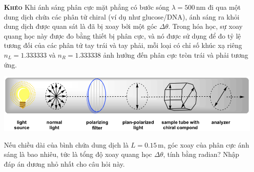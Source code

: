 \begin{problem}
{\textbf{\textsc{Khéo}}}
Khi ánh sáng phân cực mặt phẳng có bước sóng \( \lambda = 500 \, \text{nm} \) đi qua một dung dịch chứa các phân tử chiral (ví dụ như glucose/DNA), ánh sáng ra khỏi dung dịch được quan sát là đã bị xoay bởi một góc \( \Delta \theta \). Trong hóa học, sự xoay quang học này được đo bằng thiết bị phân cực, và nó được sử dụng để đo tỷ lệ tương đối của các phân tử tay trái và tay phải, mỗi loại có chỉ số khúc xạ riêng \( n_L = 1.333333 \) và \( n_R = 1.333338 \) ảnh hưởng đến phân cực tròn trái và phải tương ứng.

\begin{center}
\includegraphics[width=.8\textwidth]{problems/figures/opticalRotationSchematic.png}
\end{center}

Nếu chiều dài của bình chứa dung dịch là \( L = 0.15 \, \text{m} \), góc xoay của phân cực ánh sáng là bao nhiêu, tức là tổng độ xoay quang học \( \Delta \theta \), tính bằng radian? Nhập đáp án dương nhỏ nhất cho câu hỏi này.
\end{problem}
